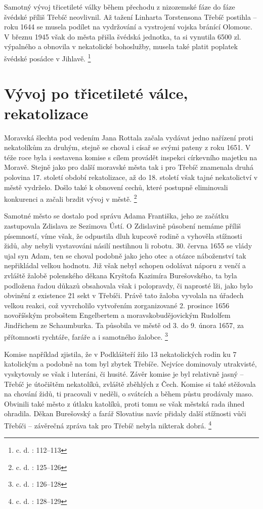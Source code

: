 \documentclass[a4paper,oneside,12p]{report}
\begin{document}
Samotný vývoj třicetileté války během přechodu z nizozemské fáze do fáze švédské příliš Třebíč neovlivnil.
Až tažení Linharta Torstensona Třebíč postihla -- roku 1644 se musela podílet na vydržování a vystrojení vojska bránící Olomouc.
V březnu 1945 však do města přišla švédská jednotka, ta si vynutila 6500 zl. výpalného a obnovila v nekatolické bohoslužby, musela také platit poplatek švédské posádce v Jihlavě. \footnote{c. d. : 112--113}

\section{Vývoj po třicetileté válce, rekatolizace}

Moravská šlechta pod vedením Jana Rottala začala vydávat jedno nařízení proti nekatolíkům za druhým, stejně se choval i císař se svými pateny z roku 1651.
V téže roce byla i sestavena komise s cílem provádět inspekci církevního majetku na Moravě.
Stejně jako pro další moravské města tak i pro Třebíč znamenala druhá polovina 17. století období rekatolizace, až do 18. století však tajné nekatolictví v městě vydrželo.
Došlo také k obnovení cechů, které postupně eliminovali konkurenci a začali brzdit vývoj v městě. \footnote{c. d. : 125--126}

Samotné město se dostalo pod správu Adama Františka, jeho ze začátku zastupovala Zdislava ze Sezimova Ústí.
O Zdislavině působení nemáme příliš písemností, víme však, že odpustila dluh kupcově rodině a vyhověla stížnosti židů, aby nebyli vystavováni násilí nestihnou li robotu.
30. června 1655 se vlády ujal syn Adam, ten se choval podobně jako jeho otec a otázce náboženství tak nepřikládal velkou hodnotu.
Již však nebyl schopen odolávat náporu z venčí a zvláště žalobě polenského děkana Kryštofa Kazimíra Burešovského, ta byla podložena řadou důkazů obsahovala však i polopravdy, či naprosté lži, jako bylo obvinění z existence 21 sekt v Třebíči.
Právě tato žaloba vyvolala na úřadech velkou reakci, což vyvrcholilo vytvořením  zorganizované 2. prosince 1656 novoříšským proboštem Engelbertem a moravskobudějovickým Rudolfem Jindřichem ze Schaumburka.
Ta působila ve městě od 3. do 9. února 1657, za přítomnosti rychtáře, faráře a i samotného žalobce. \footnote{c. d. : 126--128}

Komise například zjistila, že v Podklášteří žilo 13 nekatolických rodin ku 7 katolickým a podobně na tom byl zbytek Třebíče.
Nejvíce dominovaly utrakvisté, vyskytovaly se však i luteráni, či husité.
Závěr komise je byl relativně jasný -- Třebíč je útočištěm nekatolíků, zvláště zběhlých z Čech.
Komise si také stěžovala na chování židů, ti pracovali v neděli, o svátcích a během půstu prodávaly maso.
Obvinili také město z útlaku katolíků, proti tomu se však městská rada ihned ohradila.
Děkan Burešovský a farář Slovatius navíc přidaly další stížnosti vůči Třebíči -- závěrečná zpráva tak pro Třebíč nebyla nikterak dobrá.  \footnote{c. d. : 128--129}
\end{document}
